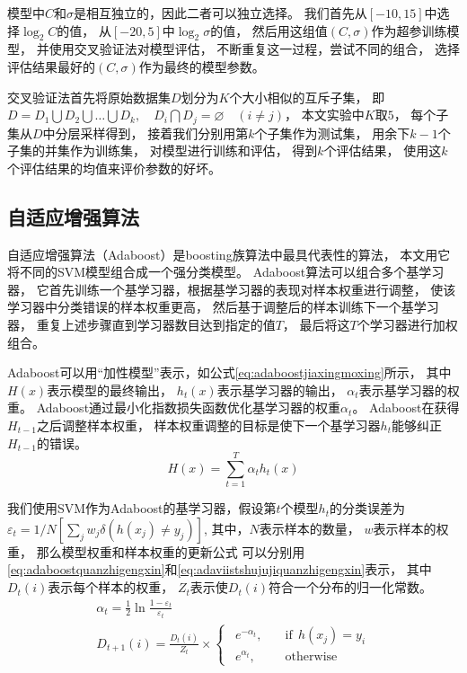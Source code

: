 模型中$C$和$\sigma$是相互独立的，因此二者可以独立选择。
我们首先从$[-10,15]$中选择$\log_2⁡C$的值，
从$[-20,5]$中$\log_2⁡\sigma$的值，
然后用这组值$(C,\sigma)$作为超参训练模型，
并使用交叉验证法对模型评估，
不断重复这一过程，尝试不同的组合，
选择评估结果最好的$(C,\sigma)$作为最终的模型参数。

交叉验证法首先将原始数据集$D$划分为$K$个大小相似的互斥子集，
即$D=D_1\bigcup D_2\bigcup \dots \bigcup D_k,\quad D_i\bigcap D_j=\varnothing \quad(i\not =j)$，
本文实验中$K$取$5$，
每个子集从$D$中分层采样得到，
接着我们分别用第$k$个子集作为测试集，
用余下$k-1$个子集的并集作为训练集，
对模型进行训练和评估，
得到$k$个评估结果，
使用这$k$个评估结果的均值来评价参数的好坏。

\subsection{自适应增强算法}
\label{subsection:adaboost}

自适应增强算法（Adaboost）是boosting族算法中最具代表性的算法，
本文用它将不同的SVM模型组合成一个强分类模型。
Adaboost算法可以组合多个基学习器，
它首先训练一个基学习器，根据基学习器的表现对样本权重进行调整，
使该学习器中分类错误的样本权重更高，
然后基于调整后的样本训练下一个基学习器，
重复上述步骤直到学习器数目达到指定的值$T$，
最后将这$T$个学习器进行加权组合。

Adaboost可以用“加性模型”表示，如公式\eqref{eq:adaboostjiaxingmoxing}所示，
其中$H(x)$表示模型的最终输出，
$h_t (x)$表示基学习器的输出，
$\alpha_t$表示基学习器的权重。
Adaboost通过最小化指数损失函数优化基学习器的权重$\alpha_t$。
Adaboost在获得$H_{t-1}$之后调整样本权重，
样本权重调整的目标是使下一个基学习器$h_t$能够纠正$H_{t-1}$的错误。
\begin{equation}
H(x)=\sum_{t=1}^T{\alpha_th_t(x)}
\label{eq:adaboostjiaxingmoxing}
\end{equation}

我们使用SVM作为Adaboost的基学习器，假设第$t$个模型$h_t$的分类误差为$\varepsilon_t=1/N\left[\sum_jw_j\delta(h(x_j)\not =y_j)\right]$,
其中，$N$表示样本的数量，
$w$表示样本的权重，
那么模型权重和样本权重的更新公式
可以分别用\eqref{eq:adaboostquanzhigengxin}和\eqref{eq:adaviistshujujiquanzhigengxin}表示，
其中$D_{t}(i)$表示每个样本的权重，
$Z_t$表示使$D_t(i)$符合一个分布的归一化常数。
\begin{gather}
\alpha_t=\frac{1}{2}\ln \frac{1-\varepsilon_t}{\varepsilon_t}  \label{eq:adaboostquanzhigengxin}\\
D_{t+1}(i)=\frac{D_t(i)}{Z_t}\times
\begin{cases}
 ~~e^{-\alpha_t},\quad &\mbox{if}~~h(x_j)=y_i\\
 ~~e^{\alpha_t},\quad &\mbox{otherwise} 
\end{cases}\label{eq:adaviistshujujiquanzhigengxin}
\end{gather}

